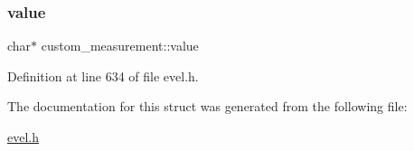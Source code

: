 \subsubsection{\texorpdfstring{value}{value}}
{\footnotesize\ttfamily char$\ast$ custom\+\_\+measurement\+::value}



Definition at line 634 of file evel.\+h.



The documentation for this struct was generated from the following file\+:\begin{DoxyCompactItemize}
\item 
\hyperlink{evel_8h}{evel.\+h}\end{DoxyCompactItemize}
